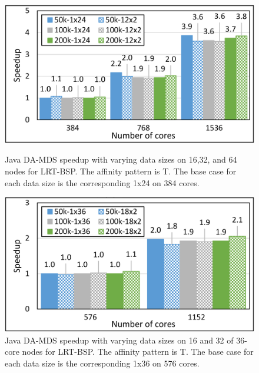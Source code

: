 \documentclass[10pt, conference, compsocconf]{IEEEtran}
\begin{document}
\begin{figure}[!htb]
	\begin{minipage}{0.49\textwidth}
        \centering
        \includegraphics[width=1\columnwidth]{images/fig_damds_LRT_BPS_speedup_binding_pattern_T}
        \caption{Java DA-MDS speedup with varying data sizes on 16,32, and 64 nodes for \ac{LRT-BSP}. The affinity pattern is T. The base case for each data size is the corresponding 1x24 on 384 cores.}
        \label{fig:fig_damds_LRT_BPS_speedup_binding_pattern_T}
    \end{minipage}
    \hspace{1.4mm}
    \begin{minipage}{0.49\textwidth}
        \centering
        \includegraphics[width=1\columnwidth]{images/fig_damds_LRT_BPS_speedup_on_36core_nodes_binding_pattern_T}
        \caption{Java DA-MDS speedup with varying data sizes on 16 and 32 of 36-core nodes for \ac{LRT-BSP}. The affinity pattern is T. The base case for each data size is the corresponding 1x36 on 576 cores.}
        \label{fig:fig_damds_LRT_BPS_speedup_on_36core_nodes_binding_pattern_T}
    \end{minipage}
\end{figure}
\end{document}
